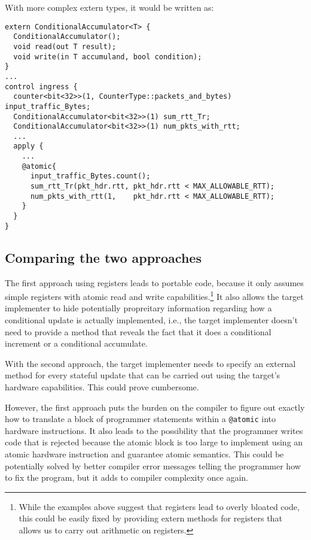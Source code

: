 With more complex extern types, it would be written as:
\begin{verbatim}
extern ConditionalAccumulator<T> {
  ConditionalAccumulator();
  void read(out T result);
  void write(in T accumuland, bool condition);
}
...
control ingress {
  counter<bit<32>>(1, CounterType::packets_and_bytes) input_traffic_Bytes;
  ConditionalAccumulator<bit<32>>(1) sum_rtt_Tr;
  ConditionalAccumulator<bit<32>>(1) num_pkts_with_rtt;
  ...
  apply {
    ... 
    @atomic{
      input_traffic_Bytes.count();
      sum_rtt_Tr(pkt_hdr.rtt, pkt_hdr.rtt < MAX_ALLOWABLE_RTT);
      num_pkts_with_rtt(1,    pkt_hdr.rtt < MAX_ALLOWABLE_RTT);
    }
  }
}
\end{verbatim}

\subsection{Comparing the two approaches}
The first approach using registers leads to portable code, because it only
assumes simple registers with atomic read and write
capabilities.\footnote{While the examples above suggest that registers lead to
overly bloated code, this could be easily fixed by providing extern methods for
registers that allows us to carry out arithmetic on registers.} It also allows
the target implementer to hide potentially propreitary information regarding
how a conditional update is actually implemented, i.e., the target implementer
doesn't need to provide a method that reveals the fact that it does a
conditional increment or a conditional accumulate.

With the second approach, the target implementer needs to specify an external
method for every stateful update that can be carried out using the target's
hardware capabilities. This could prove cumbersome.

 However, the first approach puts the burden on the compiler to figure out
exactly how to translate a block of programmer statements within a
\texttt{@atomic} into hardware instructions. It also leads to the possibility
that the programmer writes code that is rejected because the atomic block is
too large to implement using an atomic hardware instruction and guarantee
atomic semantics. This could be potentially solved by better compiler error
messages telling the programmer how to fix the program, but it adds to compiler
complexity once again.
